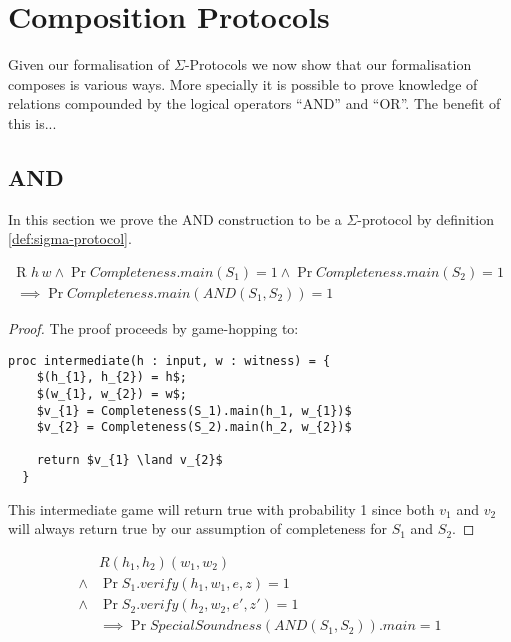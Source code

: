 \section{Composition Protocols}
\label{sec:sigma_comp}
Given our formalisation of $\Sigma$-Protocols we now show that our formalisation
composes is various ways. More specially it is possible to prove knowledge of
relations compounded by the logical operators ``AND'' and ``OR''.
The benefit of this is...

\subsection{AND}
\label{subsec:sigma_AND}

In this section we prove the AND construction to be a $\Sigma$-protocol by
definition \ref{def:sigma-protocol}.


\begin{lemma}
  \begin{align*}
    \text{R } h \, w \land
    \Pr{Completeness.main(S_{1})} = 1 \land \Pr{Completeness.main(S_{2})} = 1 \\
    \implies \Pr{Completeness.main(AND(S_{1}, S_{2}))} = 1
  \end{align*}
\end{lemma}
\begin{proof}
  The proof proceeds by game-hopping to:
  \begin{lstlisting}[mathescape]
  proc intermediate(h : input, w : witness) = {
    $(h_{1}, h_{2}) = h$;
    $(w_{1}, w_{2}) = w$;
    $v_{1} = Completeness(S_1).main(h_1, w_{1})$
    $v_{2} = Completeness(S_2).main(h_2, w_{2})$

    return $v_{1} \land v_{2}$
  }
  \end{lstlisting}

  This intermediate game will return true with probability 1 since both
  $v_{1}$ and $v_{2}$ will always return true by our assumption of completeness
  for $S_{1}$ and $S_{2}$.
\end{proof}

\begin{lemma}
  \begin{align*}
    &R (h_{1}, h_{2}) (w_{1}, w_{2}) \\
    \land &\Pr{S_{1}.verify(h_{1}, w_{1}, e, z)} = 1 \\
    \land &\Pr{S_{2}.verify(h_{2}, w_{2}, e', z')} = 1 \\
    &\implies \Pr{SpecialSoundness(AND(S_{1}, S_{2})).main} = 1
  \end{align*}
\end{lemma}


